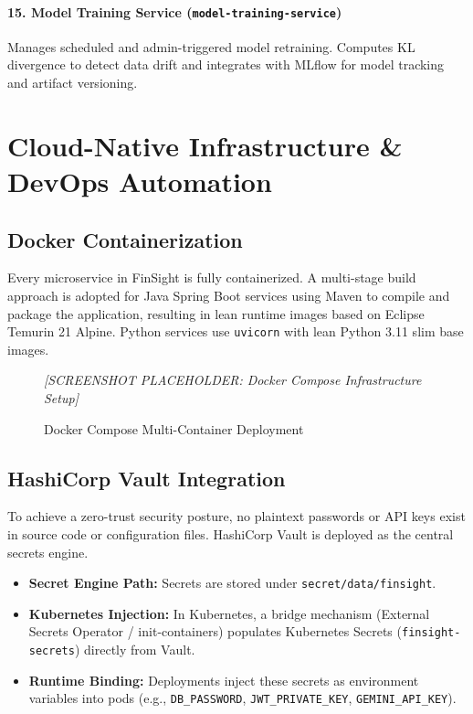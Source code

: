 \documentclass[12pt,a4paper]{report}
\begin{document}
\subsubsection{15. Model Training Service (\texttt{model-training-service})}
Manages scheduled and admin-triggered model retraining. Computes KL divergence to detect data drift and integrates with MLflow for model tracking and artifact versioning.

\chapter{Cloud-Native Infrastructure \& DevOps Automation}

\section{Docker Containerization}

Every microservice in FinSight is fully containerized. A multi-stage build approach is adopted for Java Spring Boot services using Maven to compile and package the application, resulting in lean runtime images based on Eclipse Temurin 21 Alpine. Python services use \texttt{uvicorn} with lean Python 3.11 slim base images.

\begin{figure}[H]
  \centering
  \begin{tcolorbox}[enhanced, colback=gray!10, colframe=gray!50, width=0.85\linewidth,
      height=5cm, arc=6pt, valign=center, halign=center]
    \textcolor{gray!70}{\large\textit{[SCREENSHOT PLACEHOLDER: Docker Compose Infrastructure Setup]}}
  \end{tcolorbox}
  \caption{Docker Compose Multi-Container Deployment}
\end{figure}

\section{HashiCorp Vault Integration}

To achieve a zero-trust security posture, no plaintext passwords or API keys exist in source code or configuration files. HashiCorp Vault is deployed as the central secrets engine.

\begin{itemize}[leftmargin=1.5em]
  \item \textbf{Secret Engine Path:} Secrets are stored under \texttt{secret/data/finsight}.
  \item \textbf{Kubernetes Injection:} In Kubernetes, a bridge mechanism (External Secrets Operator / init-containers) populates Kubernetes Secrets (\texttt{finsight-secrets}) directly from Vault.
  \item \textbf{Runtime Binding:} Deployments inject these secrets as environment variables into pods (e.g., \texttt{DB\_PASSWORD}, \texttt{JWT\_PRIVATE\_KEY}, \texttt{GEMINI\_API\_KEY}).
\end{itemize}
\end{document}
